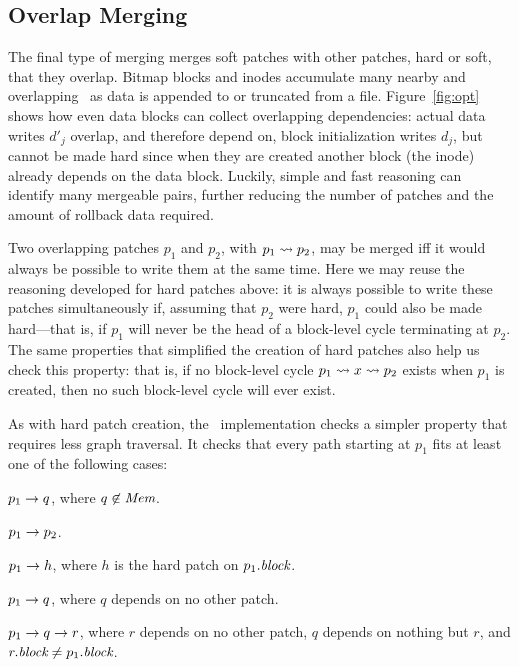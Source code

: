 \subsection{Overlap Merging}
\label{sec:chdescs:merge:overlap}

The final type of merging merges soft patches with other patches,
hard or soft, that they overlap.
%
Bitmap blocks and inodes accumulate many nearby and overlapping \chdescs\
as data is appended to or truncated from a file.
%
Figure~\ref{fig:opt} shows how even data blocks can collect overlapping
dependencies: actual data writes $d'_j$ overlap, and therefore depend on,
block initialization writes $d_j$, but cannot be made hard since when they
are created another block (the inode) already depends on the data block.
%
Luckily, simple and fast reasoning can identify many mergeable pairs,
further reducing the number of patches and the amount of rollback data
required.


Two overlapping patches $p_1$ and $p_2$, with $p_1 \leadsto p_2$, may be
merged iff it would always be possible to write them at the same time.
%
Here we may reuse the reasoning developed for hard patches above: it is
always possible to write these patches simultaneously if, assuming that
$p_2$ were hard, $p_1$ could also be made hard---that is, if $p_1$ will
never be the head of a block-level cycle terminating at $p_2$.
%
The same properties that simplified the creation of hard patches also help
us check this property: that is, if no block-level cycle $p_1 \leadsto x
\leadsto p_2$ exists when $p_1$ is created, then no such block-level cycle
will ever exist.



As with hard patch creation, the \Kudos\ implementation checks a simpler
property that requires less graph traversal.
%
It checks that every path starting at $p_1$ fits at least one of the
following cases:

\begin{xcompactitemize}
\item $p_1 \rightarrow q$, where $q \not\in \PMem$.
\item $p_1 \rightarrow p_2$.
\item $p_1 \rightarrow h$, where $h$ is the hard patch on $p_1.\textit{block}$.
\item $p_1 \rightarrow q$, where $q$ depends on no other patch.
\item $p_1 \rightarrow q \rightarrow r$, where $r$ depends on no other patch,
  $q$ depends on nothing but $r$, and $r.\textit{block} \neq p_1.\textit{block}$.
\end{xcompactitemize}

